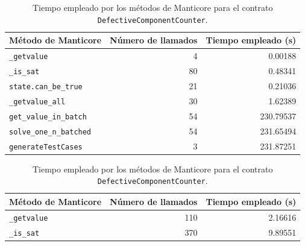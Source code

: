 \begin{table}[ht]
    \begin{minipage}{0.95\textwidth}
        \centering
        \begin{tabular}[t]{l @{\hskip 30pt} r @{\hskip 30pt} r}
            \toprule
            \textbf{Método de Manticore}                      & \textbf{Número de llamados} & \textbf{Tiempo empleado (s)} \\
            \midrule
            \rowcolor{color1} \texttt{\_getvalue}             & 4                           & 0.00188                      \\
            \rowcolor{color1} \texttt{\_is\_sat}              & 80                          & 0.48341                      \\
            \rowcolor{color2} \texttt{state.can\_be\_true}    & 21                          & 0.21036                      \\
            \rowcolor{color1} \texttt{\_getvalue\_all}        & 30                          & 1.62389                      \\
            \rowcolor{color2} \texttt{get\_value\_in\_batch}  & 54                          & 230.79537                    \\
            \rowcolor{color2} \texttt{solve\_one\_n\_batched} & 54                          & 231.65494                    \\
            \rowcolor{color3} \texttt{generateTestCases}      & 3                           & 231.87251                    \\
            \bottomrule
        \end{tabular}
        \caption{Tiempo empleado por los métodos de Manticore para el contrato \texttt{DefectiveComponentCounter}.}
        \label{tab:performance}
    \end{minipage}
    \begin{minipage}{0.95\textwidth}
        \centering
        \begin{tabular}[t]{l @{\hskip 30pt} r @{\hskip 30pt} r}
            \toprule
            \textbf{Método de Manticore}                      & \textbf{Número de llamados} & \textbf{Tiempo empleado (s)} \\
            \midrule
            \rowcolor{color1} \texttt{\_getvalue}             & 110                         & 2.16616                      \\
            \rowcolor{color1} \texttt{\_is\_sat}              & 370                         & 9.89551                      \\

\end{tabular}
\end{minipage}
\end{table}
